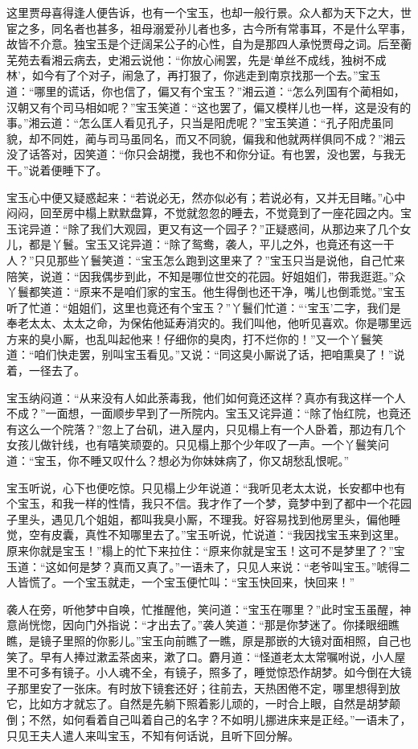 \documentclass[12pt,oneside]{book}
\begin{document}
这里贾母喜得逢人便告诉，也有一个宝玉，也却一般行景。众人都为天下之大，世宦之多，同名者也甚多，祖母溺爱孙儿者也多，古今所有常事耳，不是什么罕事，故皆不介意。独宝玉是个迂阔呆公子的心性，自为是那四人承悦贾母之词。后至蘅芜苑去看湘云病去，史湘云说他：“你放心闹罢，先是‘单丝不成线，独树不成林’，如今有了个对子，闹急了，再打狠了，你逃走到南京找那一个去。”宝玉道：“哪里的谎话，你也信了，偏又有个宝玉？”湘云道：“怎么列国有个蔺相如，汉朝又有个司马相如呢？”宝玉笑道：“这也罢了，偏又模样儿也一样，这是没有的事。”湘云道：“怎么匡人看见孔子，只当是阳虎呢？”宝玉笑道：“孔子阳虎虽同貌，却不同姓，蔺与司马虽同名，而又不同貌，偏我和他就两样俱同不成？”湘云没了话答对，因笑道：“你只会胡搅，我也不和你分证。有也罢，没也罢，与我无干。”说着便睡下了。

宝玉心中便又疑惑起来：“若说必无，然亦似必有；若说必有，又并无目睹。”心中闷闷，回至房中榻上默默盘算，不觉就忽忽的睡去，不觉竟到了一座花园之内。宝玉诧异道：“除了我们大观园，更又有这一个园子？”正疑惑间，从那边来了几个女儿，都是丫鬟。宝玉又诧异道：“除了鸳鸯，袭人，平儿之外，也竟还有这一干人？”只见那些丫鬟笑道：“宝玉怎么跑到这里来了？”宝玉只当是说他，自己忙来陪笑，说道：“因我偶步到此，不知是哪位世交的花园。好姐姐们，带我逛逛。”众丫鬟都笑道：“原来不是咱们家的宝玉。他生得倒也还干净，嘴儿也倒乖觉。”宝玉听了忙道：“姐姐们，这里也竟还有个宝玉？”丫鬟们忙道：“‘宝玉’二字，我们是奉老太太、太太之命，为保佑他延寿消灾的。我们叫他，他听见喜欢。你是哪里远方来的臭小厮，也乱叫起他来！仔细你的臭肉，打不烂你的！”又一个丫鬟笑道：“咱们快走罢，别叫宝玉看见。”又说：“同这臭小厮说了话，把咱熏臭了！”说着，一径去了。

宝玉纳闷道：“从来没有人如此荼毒我，他们如何竟还这样？真亦有我这样一个人不成？”一面想，一面顺步早到了一所院内。宝玉又诧异道：“除了怡红院，也竟还有这么一个院落？”忽上了台矶，进入屋内，只见榻上有一个人卧着，那边有几个女孩儿做针线，也有嘻笑顽耍的。只见榻上那个少年叹了一声。一个丫鬟笑问道：“宝玉，你不睡又叹什么？想必为你妹妹病了，你又胡愁乱恨呢。”

宝玉听说，心下也便吃惊。只见榻上少年说道：“我听见老太太说，长安都中也有个宝玉，和我一样的性情，我只不信。我才作了一个梦，竟梦中到了都中一个花园子里头，遇见几个姐姐，都叫我臭小厮，不理我。好容易找到他房里头，偏他睡觉，空有皮囊，真性不知哪里去了。”宝玉听说，忙说道：“我因找宝玉来到这里。原来你就是宝玉！”榻上的忙下来拉住：“原来你就是宝玉！这可不是梦里了？”宝玉道：“这如何是梦？真而又真了。”一语未了，只见人来说：“老爷叫宝玉。”唬得二人皆慌了。一个宝玉就走，一个宝玉便忙叫：“宝玉快回来，快回来！”

袭人在旁，听他梦中自唤，忙推醒他，笑问道：“宝玉在哪里？”此时宝玉虽醒，神意尚恍惚，因向门外指说：“才出去了。”袭人笑道：“那是你梦迷了。你揉眼细瞧瞧，是镜子里照的你影儿。”宝玉向前瞧了一瞧，原是那嵌的大镜对面相照，自己也笑了。早有人捧过漱盂茶卤来，漱了口。麝月道：“怪道老太太常嘱咐说，小人屋里不可多有镜子。小人魂不全，有镜子，照多了，睡觉惊恐作胡梦。如今倒在大镜子那里安了一张床。有时放下镜套还好；往前去，天热困倦不定，哪里想得到放它，比如方才就忘了。自然是先躺下照着影儿顽的，一时合上眼，自然是胡梦颠倒；不然，如何看着自己叫着自己的名字？不如明儿挪进床来是正经。”一语未了，只见王夫人遣人来叫宝玉，不知有何话说，且听下回分解。
\end{document}
